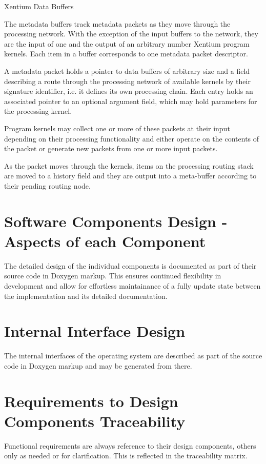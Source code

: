 %
{Xentium Data Buffers}{%
The metadata buffers track metadata packets as they move through the processing
network. With the exception of the input buffers to the network, they are
the input of one and the output of an arbitrary number \gls{Xentium} program
kernels. Each item in a buffer corresponds to one metadata packet descriptor.
\newline

A metadata packet holds a pointer to data buffers of arbitrary size and a
field describing a route through the processing network of available kernels
by their signature identifier, i.e. it defines its own processing chain.
Each entry holds an associated pointer to an optional argument field, which may
hold parameters for the processing kernel. \newline

Program kernels may collect one or more of these packets at their input
depending on their processing functionality and either operate on the contents
of the packet or generate new packets from one or more input packets.
\newline

As the packet moves through the kernels, items on the processing routing 
stack are moved to a history field and they are output into a meta-buffer
according to their pending routing node.
}%
{}{}





\section{Software Components Design - Aspects of each Component}

The detailed design of the individual components is documented as part of 
their source code in Doxygen markup. This ensures continued flexibility in
development and allow for effortless maintainance of a fully update state
between the implementation and its detailed documentation.

\section{Internal Interface Design}

The internal interfaces of the operating system are described as part of the
source code in Doxygen markup and may be generated from there.

\section{Requirements to Design Components Traceability}

\noindent
Functional requirements are always reference to their design components, others
only as needed or for clarification. This is reflected in the traceability
matrix.

\traceabilitymatrix


